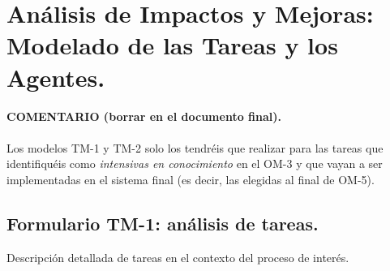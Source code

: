 \documentclass[12pt,a4paper,twoside,spanish]{article}      %
\begin{document}
\pagebreak
\section{Análisis de Impactos y Mejoras: Modelado de las Tareas y los Agentes.}

\paragraph{COMENTARIO (borrar en el documento final).} Los modelos TM-1 y TM-2 solo los tendréis que realizar para las tareas que identifiquéis como \textit{intensivas en conocimiento} en el OM-3 y que vayan a ser implementadas en el sistema final (es decir, las elegidas al final de OM-5).

\subsection{Formulario TM-1: análisis de tareas.}

Descripción detallada de tareas en el contexto del proceso de interés.
\end{document}
